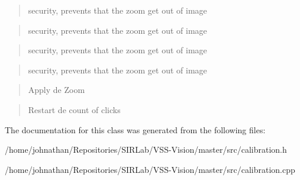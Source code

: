 \begin{quote}
security, prevents that the zoom get out of image \end{quote}


\begin{quote}
security, prevents that the zoom get out of image \end{quote}


\begin{quote}
security, prevents that the zoom get out of image \end{quote}


\begin{quote}
security, prevents that the zoom get out of image \end{quote}


\begin{quote}
Apply de Zoom \end{quote}


\begin{quote}
Restart de count of clicks \end{quote}


The documentation for this class was generated from the following files\+:\begin{DoxyCompactItemize}
\item 
/home/johnathan/\+Repositories/\+S\+I\+R\+Lab/\+V\+S\+S-\/\+Vision/master/src/calibration.\+h\item 
/home/johnathan/\+Repositories/\+S\+I\+R\+Lab/\+V\+S\+S-\/\+Vision/master/src/calibration.\+cpp\end{DoxyCompactItemize}
